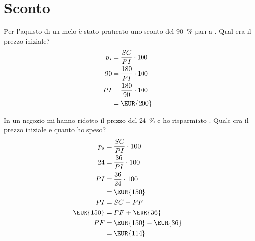 \section{Sconto}
\begin{exercise}
	Per l'aquisto di un melo è stato praticato uno sconto del  \SI{90}{\percent} pari a  . Qual era il prezzo iniziale?
	\tcblower
	\begin{align*}
		p_s={}&\dfrac{SC}{PI}\cdot 100\\
		90={}&\dfrac{180}{PI}\cdot 100\\
		PI={}&\dfrac{180}{90}\cdot 100\\
		={}&\mbox{\EUR{200}}
	\end{align*}
\end{exercise}
\begin{exercise}
In un negozio mi hanno ridotto il prezzo del  \SI{24}{\percent} e ho risparmiato . Quale era il prezzo iniziale e quanto ho speso?
	\tcblower
	\begin{align*}
		p_s={}&\dfrac{SC}{PI}\cdot 100\\
		24={}&\dfrac{36}{PI}\cdot 100\\
		PI={}&\dfrac{36}{24}\cdot 100\\
		={}&\mbox{\EUR{150}}\\
		PI={}&SC+PF\\
		\mbox{\EUR{150}}={}&PF+\mbox{\EUR{36}}\\
		PF={}&\mbox{\EUR{150}}-\mbox{\EUR{36}}\\
		={}&\mbox{\EUR{114}}\\
	\end{align*}
\end{exercise}
